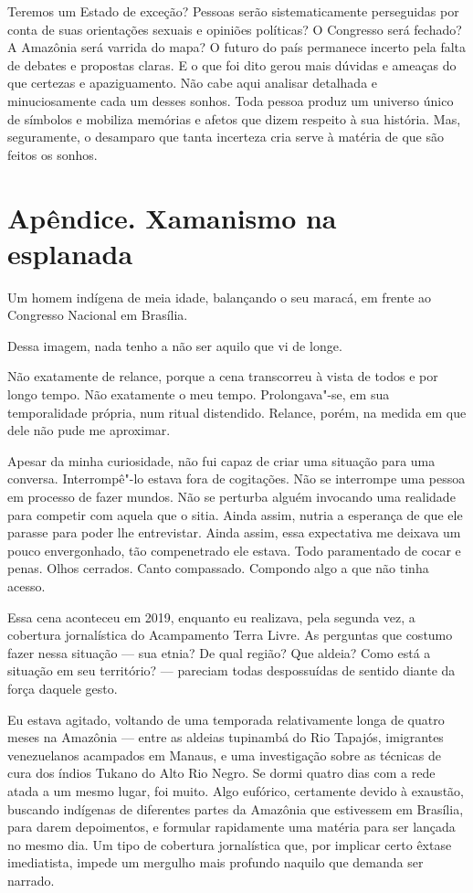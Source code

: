 \asterisc

Teremos um Estado de exceção? Pessoas serão sistematicamente perseguidas
por conta de suas orientações sexuais e opiniões políticas? O Congresso
será fechado? A Amazônia será varrida do mapa? O futuro do país
permanece incerto pela falta de debates e propostas claras. E o que foi
dito gerou mais dúvidas e ameaças do que certezas e apaziguamento. Não
cabe aqui analisar detalhada e minuciosamente cada um desses sonhos.
Toda pessoa produz um universo único de símbolos e mobiliza memórias e
afetos que dizem respeito à sua história. Mas, seguramente, o desamparo
que tanta incerteza cria serve à matéria de que são feitos os sonhos.


\chapter{Apêndice. Xamanismo na esplanada}

Um homem indígena de meia idade, balançando o seu maracá, em frente ao
Congresso Nacional em Brasília.

Dessa imagem, nada tenho a não ser aquilo que vi de longe.

Não exatamente de relance, porque a cena transcorreu à vista de todos e
por longo tempo. Não exatamente o meu tempo. Prolongava"-se, em sua
temporalidade própria, num ritual distendido. Relance, porém, na medida
em que dele não pude me aproximar.

Apesar da minha curiosidade, não fui capaz de criar uma situação para
uma conversa. Interrompê"-lo estava fora de cogitações. Não se interrompe uma pessoa em processo de fazer
mundos. Não se perturba alguém invocando uma realidade para competir com
aquela que o sitia. Ainda assim, nutria a esperança de que ele parasse
para poder lhe entrevistar. Ainda assim, essa expectativa me deixava um
pouco envergonhado, tão compenetrado ele estava. Todo paramentado de
cocar e penas. Olhos cerrados. Canto compassado. Compondo algo a que não
tinha acesso.

Essa cena aconteceu em 2019, enquanto eu realizava, pela segunda vez, a cobertura
jornalística do Acampamento Terra Livre. As perguntas que costumo fazer nessa situação ---
sua etnia? De qual região? Que aldeia? Como está a situação em seu
território? --- pareciam todas despossuídas de sentido diante da força daquele
gesto.

Eu estava agitado, voltando de uma temporada relativamente longa de
quatro meses na Amazônia --- entre as aldeias tupinambá do Rio Tapajós, %
imigrantes venezuelanos acampados em Manaus, e uma investigação sobre as
técnicas de cura dos índios Tukano do Alto Rio Negro. Se dormi quatro
dias com a rede atada a um mesmo lugar, foi muito. Algo eufórico,
certamente devido à exaustão, buscando indígenas de diferentes partes da
Amazônia que estivessem em Brasília, para darem depoimentos, e formular
rapidamente uma matéria para ser lançada no mesmo dia. Um tipo de
cobertura jornalística que, por implicar certo êxtase imediatista,
impede um mergulho mais profundo naquilo que demanda ser narrado.

